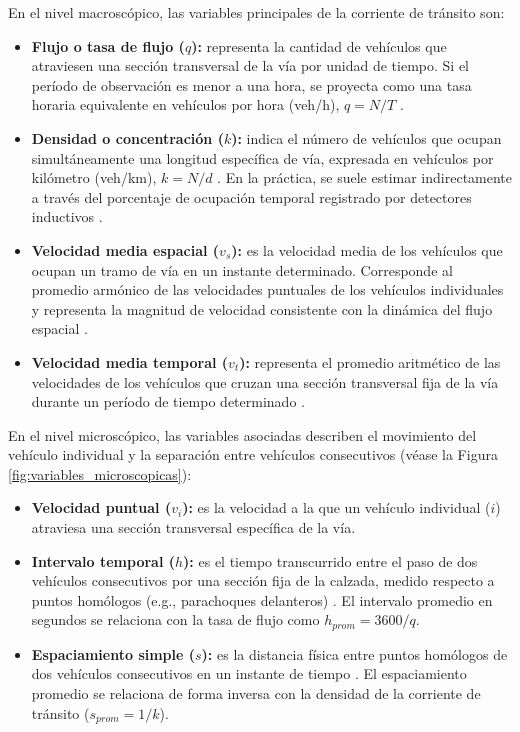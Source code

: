 En el nivel macroscópico, las variables principales de la corriente de tránsito son:
\begin{itemize}
    \item \textbf{Flujo o tasa de flujo ($q$):} representa la cantidad de vehículos que atraviesen una sección transversal de la vía por unidad de tiempo. Si el período de observación es menor a una hora, se proyecta como una tasa horaria equivalente en vehículos por hora (veh/h), $q = N/T$ \cite[p.~303]{calymayor}.
    \item \textbf{Densidad o concentración ($k$):} indica el número de vehículos que ocupan simultáneamente una longitud específica de vía, expresada en vehículos por kilómetro (veh/km), $k = N/d$ \cite[p.~308]{calymayor}. En la práctica, se suele estimar indirectamente a través del porcentaje de ocupación temporal registrado por detectores inductivos \cite[p.~204]{ite_handbook}.
    \item \textbf{Velocidad media espacial ($v_s$):} es la velocidad media de los vehículos que ocupan un tramo de vía en un instante determinado. Corresponde al promedio armónico de las velocidades puntuales de los vehículos individuales y representa la magnitud de velocidad consistente con la dinámica del flujo espacial \cite[p.~308]{calymayor}.
    \item \textbf{Velocidad media temporal ($v_t$):} representa el promedio aritmético de las velocidades de los vehículos que cruzan una sección transversal fija de la vía durante un período de tiempo determinado \cite[p.~308]{calymayor}.
\end{itemize}

En el nivel microscópico, las variables asociadas describen el movimiento del vehículo individual y la separación entre vehículos consecutivos (véase la Figura \ref{fig:variables_microscopicas}):
\begin{itemize}
    \item \textbf{Velocidad puntual ($v_i$):} es la velocidad a la que un vehículo individual ($i$) atraviesa una sección transversal específica de la vía.
    \item \textbf{Intervalo temporal ($h$):} es el tiempo transcurrido entre el paso de dos vehículos consecutivos por una sección fija de la calzada, medido respecto a puntos homólogos (e.g., parachoques delanteros) \cite[p.~303]{calymayor}. El intervalo promedio en segundos se relaciona con la tasa de flujo como $h_{prom} = 3600/q$.
    \item \textbf{Espaciamiento simple ($s$):} es la distancia física entre puntos homólogos de dos vehículos consecutivos en un instante de tiempo \cite[p.~308]{calymayor}. El espaciamiento promedio se relaciona de forma inversa con la densidad de la corriente de tránsito ($s_{prom} = 1/k$).
\end{itemize}

